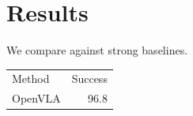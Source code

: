 \documentclass{article}
\begin{document}
\section{Results}
We compare against strong baselines.

\begin{center}
\begin{tabular}{lr}
Method & Success \\
OpenVLA & 96.8 \\
\end{tabular}
\end{center}



\end{document}
